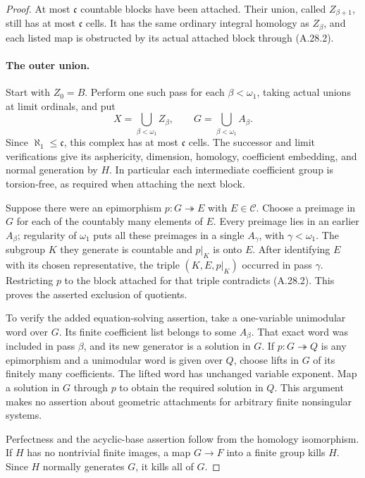 \begin{proof}
At most $\mathfrak c$ countable blocks have been
attached. Their union, called $Z_{\beta+1}$,
still has at most $\mathfrak c$ cells. It has
the same ordinary integral homology as $Z_\beta$,
and each listed map is obstructed by its actual
attached block through (A.28.2).

\paragraph{The outer union.}
Start with $Z_0=B$. Perform one such pass for each
$\beta<\omega_1$, taking actual unions at limit
ordinals, and put
\[
 X=\bigcup_{\beta<\omega_1}Z_\beta,
 \qquad G=\bigcup_{\beta<\omega_1}A_\beta.
 \tag{A.28.5}
\]
Since $\aleph_1\leq\mathfrak c$, this complex
has at most $\mathfrak c$ cells. The successor
and limit verifications give its asphericity,
dimension, homology, coefficient embedding, and
normal generation by $H$. In particular each
intermediate coefficient group is torsion-free,
as required when attaching the next block.

Suppose there were an epimorphism $p:G\twoheadrightarrow E$
with $E\in\mathcal C$. Choose a preimage in $G$
for each of the countably many elements of $E$.
Every preimage lies in an earlier $A_\beta$;
regularity of $\omega_1$ puts all these preimages
in a single $A_\gamma$, with $\gamma<\omega_1$.
The subgroup $K$ they generate is countable and
$p|_K$ is onto $E$. After identifying $E$ with
its chosen representative, the triple
$(K,E,p|_K)$ occurred in pass $\gamma$. Restricting
$p$ to the block attached for that triple
contradicts (A.28.2). This proves the asserted
exclusion of quotients.

To verify the added equation-solving assertion,
take a one-variable unimodular word over $G$.
Its finite coefficient list belongs to some
$A_\beta$. That exact word was included in
pass $\beta$, and its new generator is a
solution in $G$. If $p:G\twoheadrightarrow Q$
is any epimorphism and a unimodular word is
given over $Q$, choose lifts in $G$ of its
finitely many coefficients. The lifted word
has unchanged variable exponent. Map a
solution in $G$ through $p$ to obtain the
required solution in $Q$. This argument makes
no assertion about geometric attachments for
arbitrary finite nonsingular systems.

Perfectness and the acyclic-base assertion follow
from the homology isomorphism. If $H$ has no
nontrivial finite images, a map $G\to F$ into
a finite group kills $H$. Since $H$ normally
generates $G$, it kills all of $G$.


\end{proof}
